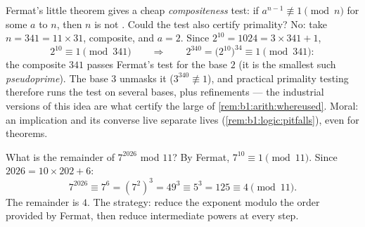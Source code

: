 \begin{example}\label{ex:b1:arith:pseudoprime}
Fermat's little theorem gives a cheap \emph{compositeness} test:
if $a^{n-1} \not\equiv 1 \pmod n$ for some $a$  to $n$,
then $n$ is not . Could the test also certify primality? No:
take $n = 341 = 11 \times 31$, composite, and $a = 2$. Since
$2^{10} = 1024 = 3 \times 341 + 1$,
\[
2^{10} \equiv 1 \pmod{341}
\qquad\Longrightarrow\qquad
2^{340} = \bigl(2^{10}\bigr)^{34} \equiv 1 \pmod{341} :
\]
the composite $341$ passes Fermat's test for the base $2$ (it is
the smallest such \emph{pseudoprime}). The base $3$ unmasks it
($3^{340} \not\equiv 1$), and practical primality testing
therefore runs the test on several bases, plus refinements ---
the industrial versions of this idea are what certify the large
 of \cref{rem:b1:arith:whereused}. Moral: an implication
and its converse live separate lives
(\cref{rem:b1:logic:pitfalls}), even for theorems.
\end{example}

\begin{example}\label{ex:b1:arith:congruences}
What is the remainder of $7^{2026}$ mod $11$? By Fermat, $7^{10}
\equiv 1 \pmod{11}$. Since $2026 = 10 \times 202 + 6$:
\[
7^{2026} \equiv 7^6 = (7^2)^3 = 49^3 \equiv 5^3 = 125 \equiv 4
\pmod{11}.
\]
The remainder is $4$. The strategy: reduce the exponent modulo the
order provided by Fermat, then reduce intermediate powers at every
step.
\end{example}

